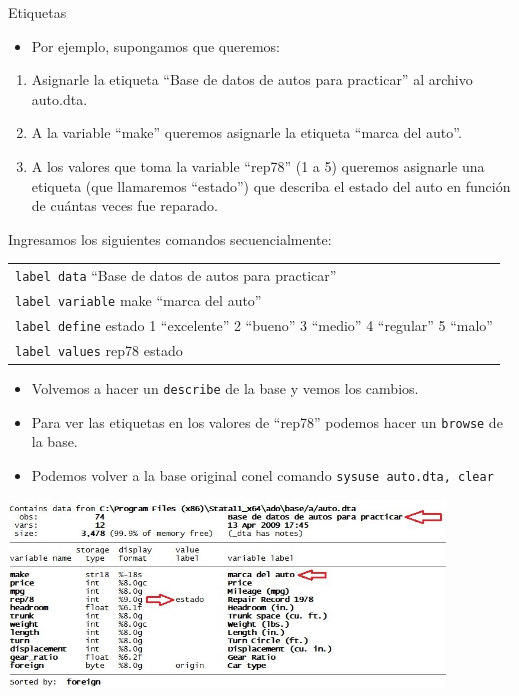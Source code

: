\documentclass{beamer}
\begin{document}
\begin{frame}[allowframebreaks]{Etiquetas}
\begin{itemize}
\item Por ejemplo, supongamos que queremos: 
\end{itemize}
\begin{enumerate}
\item Asignarle la etiqueta ``Base de datos de autos para practicar'' al archivo auto.dta. 
\item A la variable ``make'' queremos asignarle la etiqueta ``marca del auto''. 
\item A los valores que toma la variable ``rep78'' (1 a 5) queremos asignarle una etiqueta (que llamaremos ``estado'') que describa el estado del auto en función de cuántas veces fue reparado. 
\end{enumerate}
Ingresamos los siguientes comandos secuencialmente:\\
\medskip
\begin{tabular}{|p{11cm}|}
\hline
{\footnotesize \texttt{label data} ``Base de datos de autos para practicar''}\\
{\footnotesize \texttt{label variable} make ``marca del auto''}\\
{\footnotesize \texttt{label define} estado 1 ``excelente'' 2 ``bueno'' 3 ``medio'' 4 ``regular'' 5 ``malo''}\\
{\footnotesize \texttt{label values} rep78 estado}\\
\hline
\end{tabular}
\begin{itemize}
\item Volvemos a hacer un \texttt{describe} de la base y vemos los cambios.
\item Para ver las etiquetas en los valores de ``rep78'' podemos hacer un \texttt{browse} de la base.
\item Podemos volver a la base original conel comando \texttt{sysuse auto.dta, clear}
\end{itemize} 
\centerline{\includegraphics[height=5cm]{label.jpg}}

\end{frame}
\end{document}
